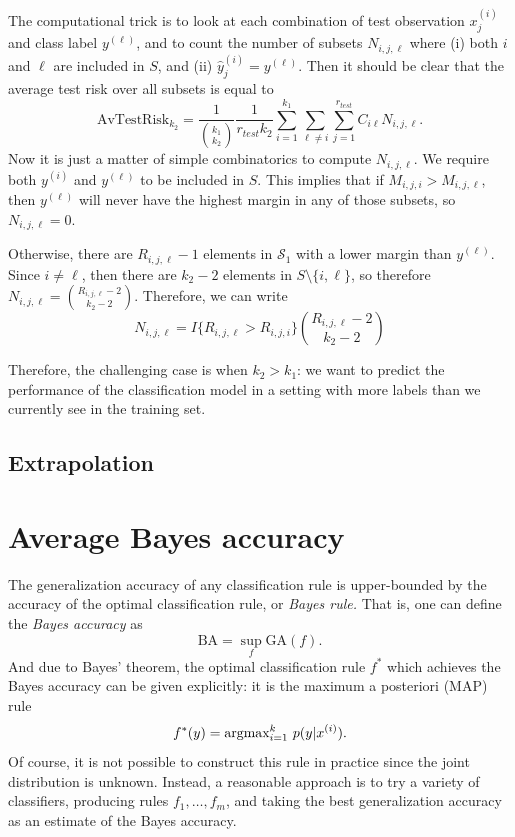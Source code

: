 The computational trick is to look at each combination of test
observation $x_j^{(i)}$ and class label $y^{(\ell)}$, and to count the
number of subsets $N_{i, j, \ell}$ where (i) both $i$ and $\ell$ are
included in $S$, and (ii) $\hat{y}_j^{(i)} = y^{(\ell)}$.  Then it
should be clear that the average test risk over all subsets is equal
to
\begin{equation}\label{eq:avtestrisk}
\text{AvTestRisk}_{k_2} = \frac{1}{{{k_1}\choose{k_2}}}\frac{1}{r_{test}k_2} \sum_{i=1}^{k_1} \sum_{\ell\neq i} \sum_{j=1}^{r_{test}} C_{i\ell}N_{i, j, \ell}.
\end{equation}
Now it is just a matter of simple combinatorics to compute
$N_{i,j,\ell}$.  We require both $y^{(i)}$ and $y^{(\ell)}$ to be
included in $S$.  This implies that if $M_{i,j,i} > M_{i,j,\ell}$,
then $y^{(\ell)}$ will never have the highest margin in any of those
subsets, so $N_{i,j,\ell} = 0$.

Otherwise, there are $R_{i,j,\ell} - 1$ elements in $\mathcal{S}_1$
with a lower margin than $y^{(\ell)}$.  Since $i \neq \ell$, then there
are $k_2-2$ elements in $S \setminus \{i, \ell\}$, so therefore $N_{i,
j, \ell} = {{R_{i,j,\ell} - 2}\choose{k_2 - 2}}$.  Therefore, we can write
\begin{equation}\label{eq:avtestrisk_nil}
N_{i,j,\ell} = I\{R_{i,j,\ell} > R_{i,j,i}\}{{R_{i,j,\ell} -2}\choose{k_2 - 2}}
\end{equation}

Therefore, the challenging case is when $k_2 > k_1$: we want to
predict the performance of the classification model in a setting with
more labels than we currently see in the training set.



\subsection{Extrapolation}

\section{Average Bayes accuracy}

The generalization accuracy of any classification rule is upper-bounded by the accuracy of the optimal classification rule, or \emph{Bayes rule.}  That is, one can define the \emph{Bayes accuracy} as
\[
\text{BA} = \sup_f \text{GA}(f).
\]
And due to Bayes' theorem, the optimal classification rule $f^*$ which
achieves the Bayes accuracy can be given explicitly: it is the maximum a
posteriori (MAP) rule
\[
f^*(y) = \text{argmax}_{i=1}^k\ p(y|x^{(i)}).
\]
Of course, it is not possible to construct this rule in practice since
the joint distribution is unknown.  Instead, a reasonable approach is
to try a variety of classifiers, producing rules $f_1,\hdots, f_m$,
and taking the best generalization accuracy as an estimate of the Bayes
accuracy. 

